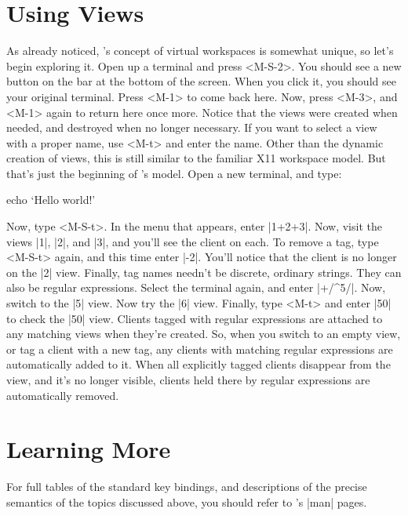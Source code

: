 \section{Using Views}

As already noticed, \wmii's concept of virtual workspaces is
somewhat unique, so let's begin exploring it. Open up a terminal
and press <M-S-2>. You should see a new button on the bar at the
bottom of the screen. When you click it, you should see your
original terminal. Press <M-1> to come back here. Now, press
<M-3>, and <M-1> again to return here once more. Notice that the
views were created when needed, and destroyed when no longer
necessary. If you want to select a view with a proper name, use
<M-t> and enter the name. Other than the dynamic creation of
views, this is still similar to the familiar X11 workspace
model. But that's just the beginning of \wmii's model. Open a new
terminal, and type:

\begin{code}
  echo ‘Hello world!’
\end{code}

\noindent Now, type <M-S-t>. In the menu that appears, enter
|1+2+3|. Now, visit the views |1|, |2|, and |3|, and you'll see
the client on each. To remove a tag, type <M-S-t> again, and
this time enter |-2|. You'll notice that the client is no longer
on the |2| view. Finally, tag names needn't be discrete,
ordinary strings. They can also be regular expressions. Select
the terminal again, and enter |+/^5/|. Now, switch to the |5|
view.  Now try the |6| view. Finally, type <M-t> and enter |50|
to check the |50| view. Clients tagged with regular expressions
are attached to any matching views when they're created. So,
when you switch to an empty view, or tag a client with a new
tag, any clients with matching regular expressions are
automatically added to it. When all explicitly tagged clients
disappear from the view, and it's no longer visible, clients
held there by regular expressions are automatically removed.

\section{Learning More}

For full tables of the standard key bindings, and descriptions
of the precise semantics of the topics discussed above, you
should refer to \wmii's |man| pages.

